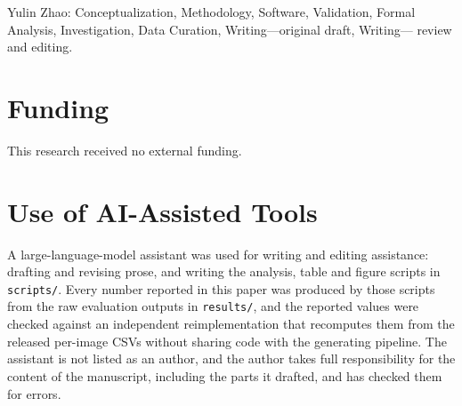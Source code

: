 \documentclass[10pt,twocolumn]{article}
\begin{document}
Yulin Zhao: Conceptualization, Methodology, Software, Validation, Formal
Analysis, Investigation, Data Curation, Writing---original draft, Writing---
review and editing.

\section*{Funding}

This research received no external funding.

\section*{Use of AI-Assisted Tools}

%

A large-language-model assistant was used for writing and editing assistance:
drafting and revising prose, and writing the analysis, table and figure
scripts in \texttt{scripts/}. Every number reported in this paper was
produced by those scripts from the raw evaluation outputs in
\texttt{results/}, and the reported values were checked against an
independent reimplementation that recomputes them from the released
per-image CSVs without sharing code with the generating pipeline. The
assistant is not listed as an author, and the author takes full
responsibility for the content of the manuscript, including the parts it
drafted, and has checked them for errors.
\end{document}
